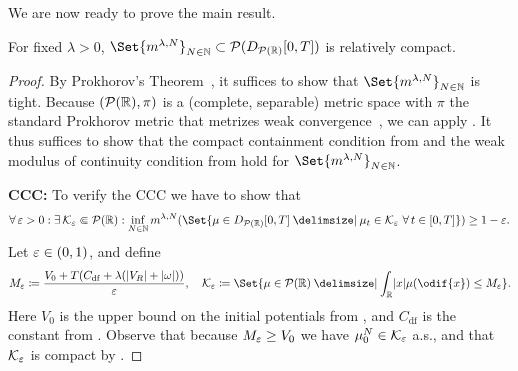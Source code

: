 We are now ready to prove the main result.

\begin{theorem}
  For fixed \(\lambda > 0\), \(\Set{ \lawmu^{\lambda, N} }_{N\in\bN} \subset \cP(D_{\cP(\potspace)}[0,T])\) is relatively compact.
\end{theorem}

\begin{proof}
  By Prokhorov's Theorem~\cite[Theorem 5.1]{billingsleyConvergenceProbabilityMeasures1999}, it suffices to show that \(\Set{ \lawmu^{\lambda, N} }_{N\in\bN}\) is tight.
  Because \((\mathcal{P}(\mathbb{R}), \pi)\) is a (complete, separable) metric space with \( \pi \) the standard Prokhorov metric that metrizes weak convergence~\cite[Theorem 6.8]{billingsleyConvergenceProbabilityMeasures1999}, we can apply .
  It thus suffices to show that the compact containment condition from  and the weak modulus of continuity condition from  hold for \( \Set{ \lawmu^{\lambda, N} }_{N\in\bN} \).

  \textbf{CCC:}
  To verify the CCC we have to show that
  \begin{equation}
    \forall \eps > 0 : \exists \cK_\eps \Subset \cP(\potspace) :
    \inf_{N\in\bN} \lawmu^{\lambda, N} ( \Set{ \mu \in D_{\cP(\potspace)}[0,T] \given \mu_t \in \cK_\eps\ \forall t \in [0,T] } ) \geq 1 - \eps.
  \end{equation}
  Let \(\varepsilon \in (0,1)\), and define
  \begin{equation}
    M_\eps \coloneqq \frac{V_0 + T ( C_\mathrm{df} + \lambda (\abs{V_R} + \abs{\omega}) )}{\eps},
    \quad
    \cK_\eps \coloneqq \Set{ \mu \in \cP(\potspace) \given \int_\potspace \abs{x} \mu(\odif{x}) \leq M_\eps }.
  \end{equation}
  Here \( V_0 \) is the upper bound on the initial potentials from , and \( C_\mathrm{df} \) is the constant from .
  Observe that because \( M_\varepsilon \geq V_0 \) we have \( \mu_0^N \in \mathcal{K}_\varepsilon \) a.s., and that \( \mathcal{K}_\varepsilon \) is compact by .


\end{proof}
